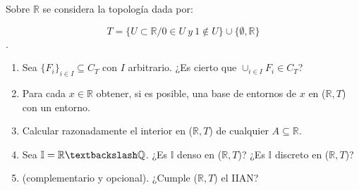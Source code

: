 \documentclass[fleqn]{article}
\begin{document}

Sobre $\mathbb{R}$ se considera la topología dada por:

$$T = \{U \subset \mathbb{R} / 0 \in U \ y \ 1 \notin U \} \cup \{ \emptyset, \mathbb{R} \}$$.

\begin{enumerate}

	\item Sea $\{F_i\}_{i \in I} \subseteq C_T$ con $I$ arbitrario. ¿Es cierto que $\cup_{i \in I}F_i \in C_T$?

	\item Para cada $x \in \mathbb{R}$ obtener, si es posible, una base de entornos de $x$ en ($\mathbb{R}, T$) con un entorno.

	\item Calcular razonadamente el interior en ($\mathbb{R}, T$) de cualquier $A \subseteq \mathbb{R}$.

	\item Sea $\mathbb{I} = \mathbb{R} \textbackslash \mathbb{Q}$. ¿Es $\mathbb{I}$ denso en ($\mathbb{R}, T$)? ¿Es $\mathbb{I}$ discreto en ($\mathbb{R}, T$)?

	\item (complementario y opcional). ¿Cumple ($\mathbb{R}, T$) el IIAN?

\end{enumerate}
\end{document}
